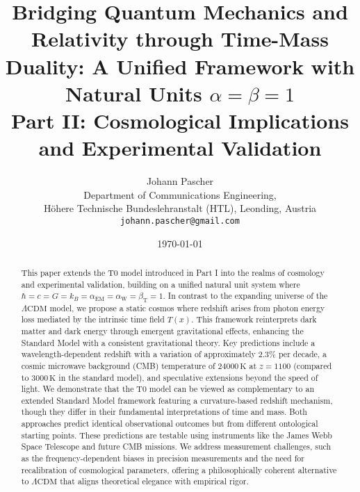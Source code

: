 \documentclass[12pt,a4paper]{article}
\newcommand{\Tfield}{T(x)}
\newcommand{\alphaEM}{\alpha_{\text{EM}}}
\newcommand{\alphaW}{\alpha_{\text{W}}}
\newcommand{\betaT}{\beta_{\text{T}}}
\newcommand{\LCDM}{\Lambda\text{CDM}}
\begin{document}
	
	\title{Bridging Quantum Mechanics and Relativity through Time-Mass Duality: A Unified Framework with Natural Units \(\alpha = \beta = 1\) \\ Part II: Cosmological Implications and Experimental Validation}
	\author{Johann Pascher\\
		Department of Communications Engineering, \\Höhere Technische Bundeslehranstalt (HTL), Leonding, Austria\\
		\texttt{johann.pascher@gmail.com}}
	\date{\today}
	
	\maketitle
	
	\begin{abstract}
		This paper extends the T0 model introduced in Part I into the realms of cosmology and experimental validation, building on a unified natural unit system where \(\hbar = c = G = k_B = \alphaEM = \alphaW = \betaT = 1\). In contrast to the expanding universe of the \(\LCDM\) model, we propose a static cosmos where redshift arises from photon energy loss mediated by the intrinsic time field \(\Tfield\). This framework reinterprets dark matter and dark energy through emergent gravitational effects, enhancing the Standard Model with a consistent gravitational theory. Key predictions include a wavelength-dependent redshift with a variation of approximately \(2.3\%\) per decade, a cosmic microwave background (CMB) temperature of \(24000 \, \text{K}\) at \(z = 1100\) (compared to \(3000 \, \text{K}\) in the standard model), and speculative extensions beyond the speed of light. We demonstrate that the T0 model can be viewed as complementary to an extended Standard Model framework featuring a curvature-based redshift mechanism, though they differ in their fundamental interpretations of time and mass. Both approaches predict identical observational outcomes but from different ontological starting points. These predictions are testable using instruments like the James Webb Space Telescope and future CMB missions. We address measurement challenges, such as the frequency-dependent biases in precision measurements and the need for recalibration of cosmological parameters, offering a philosophically coherent alternative to \(\LCDM\) that aligns theoretical elegance with empirical rigor.
	\end{abstract}
	\newpage
	\tableofcontents
	\newpage
\end{document}
